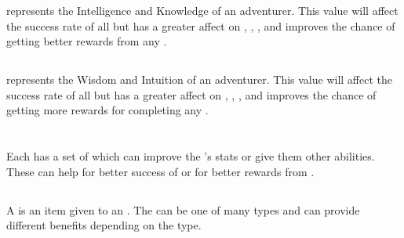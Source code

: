  represents the Intelligence and Knowledge of an adventurer. This value will affect the success rate of all  but has a greater affect on , , , and improves the chance of getting better rewards from any .

\subsection{}

 represents the Wisdom and Intuition of an adventurer. This value will affect the success rate of all  but has a greater affect on , , , and improves the chance of getting more rewards for completing any .




\section{}

Each  has a set of  which can improve the 's stats or give them other abilities. These  can help for better success of  or for better rewards from .

\subsection{}

A  is an item given to an . The  can be one of many types and can provide different benefits depending on the type.

